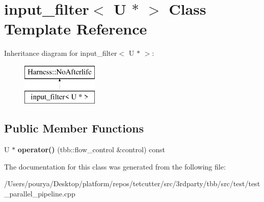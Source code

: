 \hypertarget{classinput__filter_3_01U_01_5_01_4}{}\section{input\+\_\+filter$<$ U $\ast$ $>$ Class Template Reference}
\label{classinput__filter_3_01U_01_5_01_4}
Inheritance diagram for input\+\_\+filter$<$ U $\ast$ $>$\+:\begin{figure}[H]
\begin{center}
\leavevmode
\includegraphics[height=2.000000cm]{classinput__filter_3_01U_01_5_01_4}
\end{center}
\end{figure}
\subsection*{Public Member Functions}
\begin{DoxyCompactItemize}
\item 
\hypertarget{classinput__filter_3_01U_01_5_01_4_acf6d4a92cce0502fd731e932a41a10e8}{}U $\ast$ {\bfseries operator()} (tbb\+::flow\+\_\+control \&control) const \label{classinput__filter_3_01U_01_5_01_4_acf6d4a92cce0502fd731e932a41a10e8}

\end{DoxyCompactItemize}


The documentation for this class was generated from the following file\+:\begin{DoxyCompactItemize}
\item 
/\+Users/pourya/\+Desktop/platform/repos/tetcutter/src/3rdparty/tbb/src/test/test\+\_\+parallel\+\_\+pipeline.\+cpp\end{DoxyCompactItemize}
